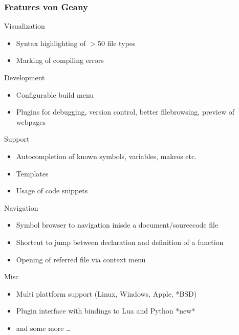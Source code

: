 \documentclass[compress]{beamer}
\begin{document}
	\begin{frame}[allowframebreaks]
		\frametitle{Features von Geany}
		
		\begin{block}{Visualization}
			\begin{itemize}
				\item Syntax highlighting of $>$50 file types
				\item Marking of compiling errors
			\end{itemize}
		\end{block}
		
		\begin{block}{Development}
			\begin{itemize}
				\item Configurable build menu
				\item Plugins for debugging, version control, 
					better filebrowsing, preview of webpages
			\end{itemize}
		\end{block}
		
		\begin{block}{Support}
			\begin{itemize}
				\item Autocompletion of known symbols, variables, makros etc.
				\item Templates
				\item Usage of code snippets
			\end{itemize}
		\end{block}
		
		\begin{block}{Navigation}
			\begin{itemize}
				\item Symbol browser to navigation inisde a document/sourcecode file
				\item Shortcut to jump between declaration and definition of a function
				\item Opening of referred file via context menu
			\end{itemize}
		\end{block}
		
		\begin{block}{Misc}
			\begin{itemize}
				\item Multi plattform support (Linux, Windows, Apple, *BSD)
				\item Plugin interface with bindings to Lua and Python *new*
				\item and some more \dots
			\end{itemize}
		\end{block}
	\end{frame}
\end{document}
